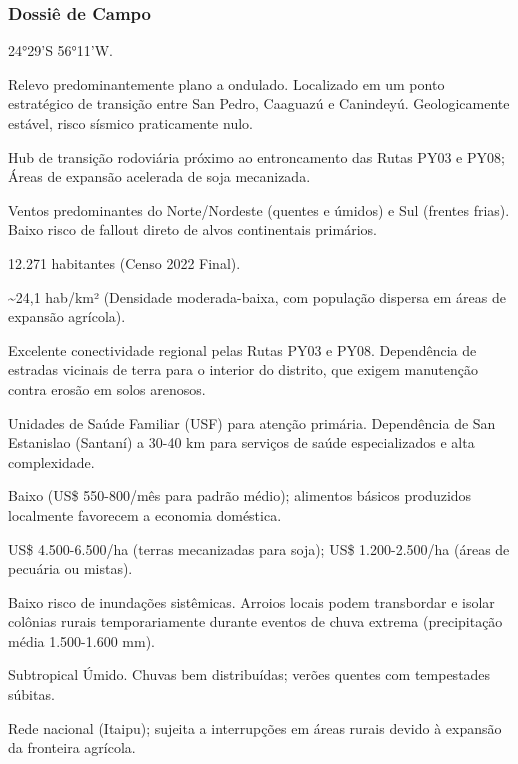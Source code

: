 \subsubsection{Dossiê de Campo}
\begin{description}[style=nextline,leftmargin=0.5cm,font=\bfseries]
\item[Coordenadas]  24°29'S 56°11'W.
\item[Topografia]  Relevo predominantemente plano a ondulado. Localizado em um ponto estratégico de transição entre San Pedro, Caaguazú e Canindeyú. Geologicamente estável, risco sísmico praticamente nulo.
\item[Alvos Estratégicos]  Hub de transição rodoviária próximo ao entroncamento das Rutas PY03 e PY08; Áreas de expansão acelerada de soja mecanizada.
\item[Fallout]  Ventos predominantes do Norte/\allowbreak Nordeste (quentes e úmidos) e Sul (frentes frias). Baixo risco de fallout direto de alvos continentais primários.
\item[População]  12.271 habitantes (Censo 2022 Final).
\item[Densidade]  \textasciitilde 24,1 hab/\allowbreak km² (Densidade moderada-baixa, com população dispersa em áreas de expansão agrícola).
\item[Vias de Acesso]  Excelente conectividade regional pelas Rutas PY03 e PY08. Dependência de estradas vicinais de terra para o interior do distrito, que exigem manutenção contra erosão em solos arenosos.
\item[Serviços]  Unidades de Saúde Familiar (USF) para atenção primária. Dependência de San Estanislao (Santaní) a 30-40 km para serviços de saúde especializados e alta complexidade.
\item[Custo de Vida]  Baixo (US\$ 550-800/\allowbreak mês para padrão médio); alimentos básicos produzidos localmente favorecem a economia doméstica.
\item[Preço da Terra]  US\$ 4.500-6.500/\allowbreak ha (terras mecanizadas para soja); US\$ 1.200-2.500/\allowbreak ha (áreas de pecuária ou mistas).
\item[Hidrologia]  Baixo risco de inundações sistêmicas. Arroios locais podem transbordar e isolar colônias rurais temporariamente durante eventos de chuva extrema (precipitação média 1.500-1.600 mm).
\item[Clima]  Subtropical Úmido. Chuvas bem distribuídas; verões quentes com tempestades súbitas.
\item[Energia]  Rede nacional (Itaipu); sujeita a interrupções em áreas rurais devido à expansão da fronteira agrícola.

\end{description}
